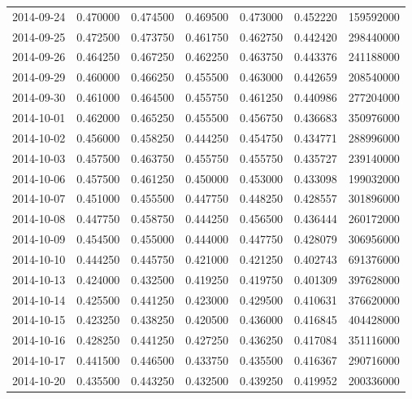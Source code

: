 \begin{tabular}{lrrrrrr}
2014-09-24 &    0.470000 &    0.474500 &    0.469500 &    0.473000 &    0.452220 &   159592000 \\
2014-09-25 &    0.472500 &    0.473750 &    0.461750 &    0.462750 &    0.442420 &   298440000 \\
2014-09-26 &    0.464250 &    0.467250 &    0.462250 &    0.463750 &    0.443376 &   241188000 \\
2014-09-29 &    0.460000 &    0.466250 &    0.455500 &    0.463000 &    0.442659 &   208540000 \\
2014-09-30 &    0.461000 &    0.464500 &    0.455750 &    0.461250 &    0.440986 &   277204000 \\
2014-10-01 &    0.462000 &    0.465250 &    0.455500 &    0.456750 &    0.436683 &   350976000 \\
2014-10-02 &    0.456000 &    0.458250 &    0.444250 &    0.454750 &    0.434771 &   288996000 \\
2014-10-03 &    0.457500 &    0.463750 &    0.455750 &    0.455750 &    0.435727 &   239140000 \\
2014-10-06 &    0.457500 &    0.461250 &    0.450000 &    0.453000 &    0.433098 &   199032000 \\
2014-10-07 &    0.451000 &    0.455500 &    0.447750 &    0.448250 &    0.428557 &   301896000 \\
2014-10-08 &    0.447750 &    0.458750 &    0.444250 &    0.456500 &    0.436444 &   260172000 \\
2014-10-09 &    0.454500 &    0.455000 &    0.444000 &    0.447750 &    0.428079 &   306956000 \\
2014-10-10 &    0.444250 &    0.445750 &    0.421000 &    0.421250 &    0.402743 &   691376000 \\
2014-10-13 &    0.424000 &    0.432500 &    0.419250 &    0.419750 &    0.401309 &   397628000 \\
2014-10-14 &    0.425500 &    0.441250 &    0.423000 &    0.429500 &    0.410631 &   376620000 \\
2014-10-15 &    0.423250 &    0.438250 &    0.420500 &    0.436000 &    0.416845 &   404428000 \\
2014-10-16 &    0.428250 &    0.441250 &    0.427250 &    0.436250 &    0.417084 &   351116000 \\
2014-10-17 &    0.441500 &    0.446500 &    0.433750 &    0.435500 &    0.416367 &   290716000 \\
2014-10-20 &    0.435500 &    0.443250 &    0.432500 &    0.439250 &    0.419952 &   200336000 \\

\end{tabular}
